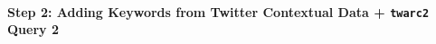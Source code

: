 
            
            
        

            
        \paragraph{Step 2: Adding Keywords from Twitter Contextual Data + \texttt{twarc2} Query 2}
        
        \newline\indent
        

